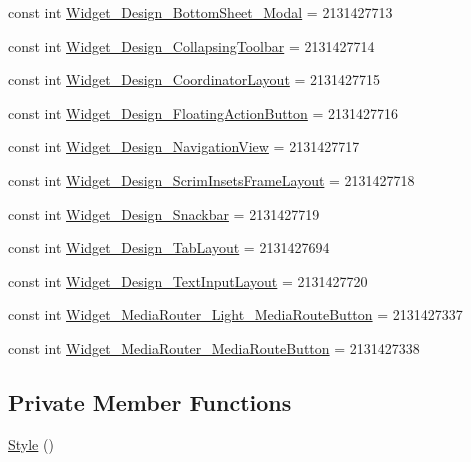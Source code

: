 \begin{DoxyCompactItemize}
const int \mbox{\hyperlink{class_f_w_p_s___app_1_1_droid_1_1_resource_1_1_style_a1cf3e7d8c01d5b5a1cf3877f010584bb}{Widget\+\_\+\+Design\+\_\+\+Bottom\+Sheet\+\_\+\+Modal}} = 2131427713
\item 
const int \mbox{\hyperlink{class_f_w_p_s___app_1_1_droid_1_1_resource_1_1_style_a114fc1accd3230daef4957fcdcbfb6f1}{Widget\+\_\+\+Design\+\_\+\+Collapsing\+Toolbar}} = 2131427714
\item 
const int \mbox{\hyperlink{class_f_w_p_s___app_1_1_droid_1_1_resource_1_1_style_a59db7cd4f7a898622979db24378bf457}{Widget\+\_\+\+Design\+\_\+\+Coordinator\+Layout}} = 2131427715
\item 
const int \mbox{\hyperlink{class_f_w_p_s___app_1_1_droid_1_1_resource_1_1_style_a37afaac11f6684af64ec0245f6b0d86d}{Widget\+\_\+\+Design\+\_\+\+Floating\+Action\+Button}} = 2131427716
\item 
const int \mbox{\hyperlink{class_f_w_p_s___app_1_1_droid_1_1_resource_1_1_style_a76bf5d09df2bff9c5f0eaeedac7fc2d7}{Widget\+\_\+\+Design\+\_\+\+Navigation\+View}} = 2131427717
\item 
const int \mbox{\hyperlink{class_f_w_p_s___app_1_1_droid_1_1_resource_1_1_style_a9672c2d4a502dec72054d615db981950}{Widget\+\_\+\+Design\+\_\+\+Scrim\+Insets\+Frame\+Layout}} = 2131427718
\item 
const int \mbox{\hyperlink{class_f_w_p_s___app_1_1_droid_1_1_resource_1_1_style_a5c0db2ea9de61763e4462aed678a1e2f}{Widget\+\_\+\+Design\+\_\+\+Snackbar}} = 2131427719
\item 
const int \mbox{\hyperlink{class_f_w_p_s___app_1_1_droid_1_1_resource_1_1_style_a6cefad30afaaa99692150e3f743500d8}{Widget\+\_\+\+Design\+\_\+\+Tab\+Layout}} = 2131427694
\item 
const int \mbox{\hyperlink{class_f_w_p_s___app_1_1_droid_1_1_resource_1_1_style_a4d1bca2eb360649b79ace7e1bcecb18b}{Widget\+\_\+\+Design\+\_\+\+Text\+Input\+Layout}} = 2131427720
\item 
const int \mbox{\hyperlink{class_f_w_p_s___app_1_1_droid_1_1_resource_1_1_style_acd580db06776f296fd0b24b40f86bd97}{Widget\+\_\+\+Media\+Router\+\_\+\+Light\+\_\+\+Media\+Route\+Button}} = 2131427337
\item 
const int \mbox{\hyperlink{class_f_w_p_s___app_1_1_droid_1_1_resource_1_1_style_aaa2ddce1421cf7877d7cbdd75444ae50}{Widget\+\_\+\+Media\+Router\+\_\+\+Media\+Route\+Button}} = 2131427338
\end{DoxyCompactItemize}
\subsection*{Private Member Functions}
\begin{DoxyCompactItemize}
\item 
\mbox{\hyperlink{class_f_w_p_s___app_1_1_droid_1_1_resource_1_1_style_a0506d87a054eab059761cdd4d80efda0}{Style}} ()
\end{DoxyCompactItemize}
